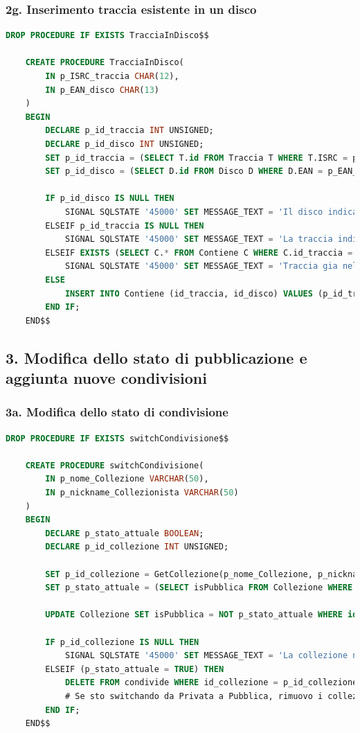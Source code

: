 \documentclass{article}
\begin{document}
\subsubsection*{2g. Inserimento traccia esistente in un disco}
\begin{lstlisting}[language=SQL]
    DROP PROCEDURE IF EXISTS TracciaInDisco$$

    CREATE PROCEDURE TracciaInDisco(
        IN p_ISRC_traccia CHAR(12),
        IN p_EAN_disco CHAR(13)
    )
    BEGIN
        DECLARE p_id_traccia INT UNSIGNED;
        DECLARE p_id_disco INT UNSIGNED;
        SET p_id_traccia = (SELECT T.id FROM Traccia T WHERE T.ISRC = p_ISRC_traccia);
        SET p_id_disco = (SELECT D.id FROM Disco D WHERE D.EAN = p_EAN_disco);
        
        IF p_id_disco IS NULL THEN
            SIGNAL SQLSTATE '45000' SET MESSAGE_TEXT = 'Il disco indicato non esiste';
        ELSEIF p_id_traccia IS NULL THEN
            SIGNAL SQLSTATE '45000' SET MESSAGE_TEXT = 'La traccia indicata non esiste';
        ELSEIF EXISTS (SELECT C.* FROM Contiene C WHERE C.id_traccia = p_id_traccia AND C.id_disco = p_id_disco) THEN
            SIGNAL SQLSTATE '45000' SET MESSAGE_TEXT = 'Traccia gia nel disco';
        ELSE
            INSERT INTO Contiene (id_traccia, id_disco) VALUES (p_id_traccia, p_id_disco);
        END IF;
    END$$
\end{lstlisting}
    
\subsection*{3. Modifica dello stato di pubblicazione e aggiunta nuove condivisioni}
\subsubsection*{3a. Modifica dello stato di condivisione}
\begin{lstlisting}[language=SQL]
    DROP PROCEDURE IF EXISTS switchCondivisione$$

    CREATE PROCEDURE switchCondivisione(
        IN p_nome_Collezione VARCHAR(50),
        IN p_nickname_Collezionista VARCHAR(50)
    )
    BEGIN
        DECLARE p_stato_attuale BOOLEAN;
        DECLARE p_id_collezione INT UNSIGNED;
        
        SET p_id_collezione = GetCollezione(p_nome_Collezione, p_nickname_Collezionista);
        SET p_stato_attuale = (SELECT isPubblica FROM Collezione WHERE id = p_id_collezione);
        
        UPDATE Collezione SET isPubblica = NOT p_stato_attuale WHERE id = p_id_collezione;
        
        IF p_id_collezione IS NULL THEN 
            SIGNAL SQLSTATE '45000' SET MESSAGE_TEXT = 'La collezione non esiste';
        ELSEIF (p_stato_attuale = TRUE) THEN
            DELETE FROM condivide WHERE id_collezione = p_id_collezione;
            # Se sto switchando da Privata a Pubblica, rimuovo i collezionisti con cui era condivisa
        END IF;
    END$$
\end{lstlisting}
\end{document}
